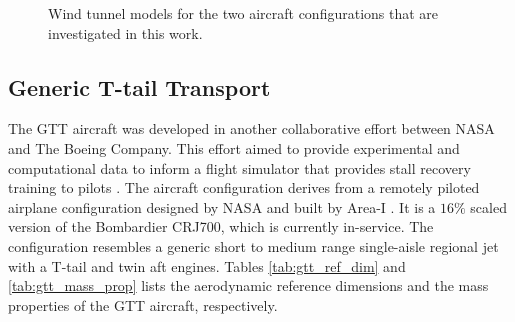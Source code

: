 \begin{figure}
\center
{}
\caption{Wind tunnel models for the two aircraft configurations that are investigated in this work.}\label{fig:aircraft_images}
\end{figure}

\subsection{Generic T-tail Transport}

The GTT aircraft was developed in another collaborative effort between NASA and The Boeing Company. 
This effort aimed to provide experimental and computational data to inform a flight simulator that provides stall recovery training to pilots \cite{cunningham_generic_2018}.
The aircraft configuration derives from a remotely piloted airplane configuration designed by NASA and built by Area-I \cite{kuehme_flight_2014}.
It is a $16\%$ scaled version of the Bombardier CRJ700, which is currently in-service.
The configuration resembles a generic short to medium range single-aisle regional jet with a T-tail and twin aft engines.
Tables \ref{tab:gtt_ref_dim} and \ref{tab:gtt_mass_prop} lists the aerodynamic reference dimensions and the mass properties of the GTT aircraft, respectively.

